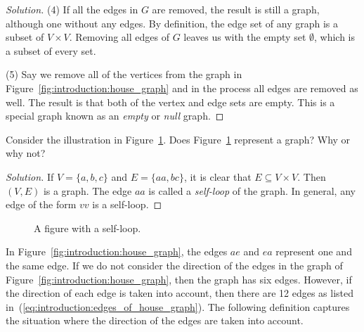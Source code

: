 \begin{proof}[Solution]
(4) If all the edges in $G$ are removed, the result is still a graph,
although one without any edges. By definition, the edge set of any
graph is a subset of $V \times V$. Removing all edges of $G$ leaves us
with the empty set $\emptyset$, which is a subset of every set.

(5) Say we remove all of the vertices from the graph in
Figure~\ref{fig:introduction:house_graph} and in the process all edges
are removed as well. The result is that both of the vertex and edge
sets are empty. This is a special graph known as an \emph{empty} or
\emph{null} graph.
\end{proof}

\begin{example}
Consider the illustration in
Figure~\ref{fig:introduction:self_loop}. Does
Figure~\ref{fig:introduction:self_loop} represent a graph? Why or why not?
\end{example}

\begin{proof}[Solution]
If $V = \{ a, b, c \}$ and $E = \{ aa, bc \}$, it is clear that $E
\subseteq V \times V$. Then $(V, E)$ is a graph. The edge $aa$ is
called a \emph{self-loop} of the graph. In general, any edge of the
form $vv$ is a self-loop.
\end{proof}

\begin{figure}[!htbp]
\centering
{}
\caption{A figure with a self-loop.}
\label{fig:introduction:self_loop}
\end{figure}

In Figure~\ref{fig:introduction:house_graph}, the edges $ae$ and $ea$
represent one and the same edge. If we do not consider the direction
of the edges in the graph of
Figure~\ref{fig:introduction:house_graph}, then the graph has six
edges. However, if the direction of each edge is taken into account,
then there are 12 edges as listed
in~(\ref{eq:introduction:edges_of_house_graph}). The following
definition captures the situation where the direction of the edges are
taken into account.

